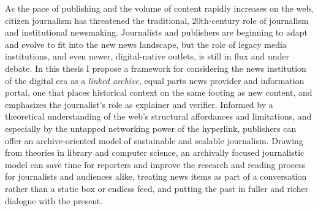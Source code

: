 % 
% 
%
As the pace of publishing and the volume of content rapidly increases on the web, citizen journalism has threatened the traditional, 20th-century role of journalism and institutional newsmaking. Journalists and publishers are beginning to adapt and evolve to fit into the new news landscape, but the role of legacy media institutions, and even newer, digital-native outlets, is still in flux and under debate. In this thesis I propose a framework for considering the news institution of the digital era as a \emph{linked archive}, equal parts news provider and information portal, one that places historical context on the same footing as new content, and emphasizes the journalist's role as explainer and verifier. Informed by a theoretical understanding of the web's structural affordances and limitations, and especially by the untapped networking power of the hyperlink, publishers can offer an archive-oriented model of sustainable and scalable journalism. Drawing from theories in library and computer science, an archivally focused journalistic model can save time for reporters and improve the research and reading process for journalists and audiences alike, treating news items as part of a conversation rather than a static box or endless feed, and putting the past in fuller and richer dialogue with the present.